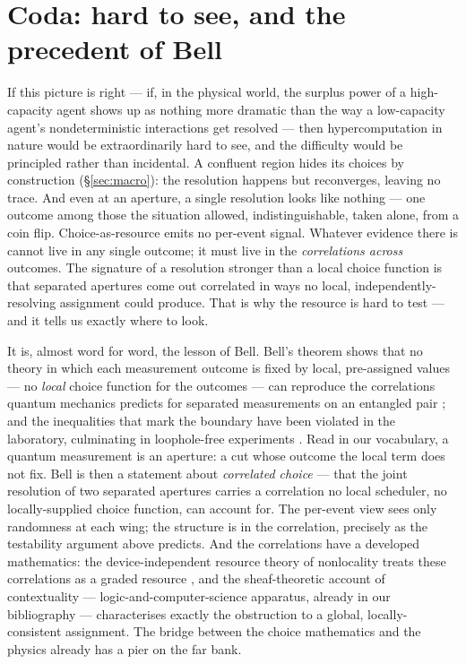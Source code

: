 \documentclass[11pt]{article}
\theoremstyle{definition}
\theoremstyle{plain}
\theoremstyle{remark}
\begin{document}
\section{Coda: hard to see, and the precedent of Bell}\label{sec:coda}

If this picture is right --- if, in the physical world, the surplus power of a high-capacity
agent shows up as nothing more dramatic than the way a low-capacity agent's nondeterministic
interactions get resolved --- then hypercomputation in nature would be extraordinarily hard to
see, and the difficulty would be principled rather than incidental. A confluent region hides
its choices by construction (\S\ref{sec:macro}): the resolution happens but reconverges,
leaving no trace. And even at an aperture, a single resolution looks like nothing --- one
outcome among those the situation allowed, indistinguishable, taken alone, from a coin flip.
Choice-as-resource emits no per-event signal. Whatever evidence there is cannot live in any
single outcome; it must live in the \emph{correlations across} outcomes. The signature of a
resolution stronger than a local choice function is that separated apertures come out
correlated in ways no local, independently-resolving assignment could produce. That is why the
resource is hard to test --- and it tells us exactly where to look.

It is, almost word for word, the lesson of Bell. Bell's theorem shows that no theory in which
each measurement outcome is fixed by local, pre-assigned values --- no \emph{local} choice
function for the outcomes --- can reproduce the correlations quantum mechanics predicts for
separated measurements on an entangled pair \cite{bell}; and the inequalities that mark the
boundary have been violated in the laboratory, culminating in loophole-free experiments
\cite{hensen}. Read in our vocabulary, a quantum measurement is an aperture: a cut whose
outcome the local term does not fix. Bell is then a statement about \emph{correlated choice} ---
that the joint resolution of two separated apertures carries a correlation no local scheduler,
no locally-supplied choice function, can account for. The per-event view sees only randomness
at each wing; the structure is in the correlation, precisely as the testability argument above
predicts. And the correlations have a developed mathematics: the device-independent resource
theory of nonlocality treats these correlations as a graded resource \cite{brunner}, and the
sheaf-theoretic account of contextuality \cite{abramsky} --- logic-and-computer-science
apparatus, already in our bibliography --- characterises exactly the obstruction to a global,
locally-consistent assignment. The bridge between the choice mathematics and the physics already
has a pier on the far bank.
\end{document}
